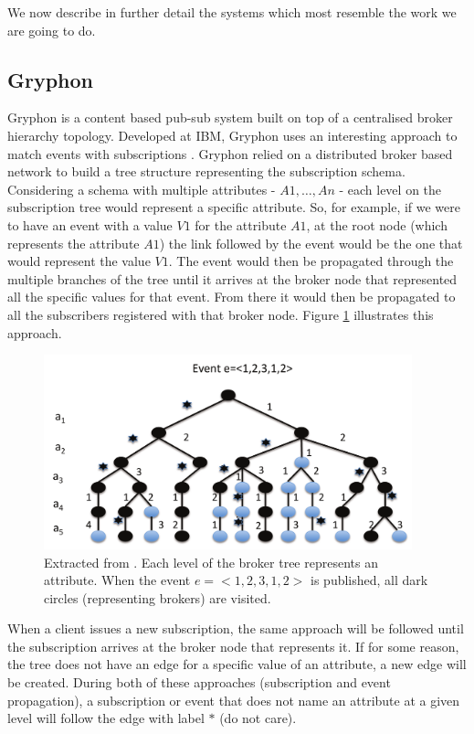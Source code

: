 We now describe in further detail the systems which most resemble the
work we are going to do.

\subsection{Gryphon}\label{gryphon}

Gryphon \cite{Strom1998} is a content based pub-sub system
built on top of a centralised broker hierarchy topology. Developed at
IBM, Gryphon uses an interesting approach to match events with
subscriptions \cite{Aguilera1999}. Gryphon relied on a distributed broker based
network to build a tree structure representing the
subscription schema. Considering a schema with multiple attributes -
$A1,\ldots{},An$ - each level on the subscription tree would represent a
specific attribute. So, for example, if we were to have an event with a
value $V1$ for the attribute $A1$, at the root node (which represents the
attribute $A1$) the link followed by the event would be the one that would
represent the value $V1$. The event would then be propagated through the
multiple branches of the tree until it arrives at the broker node that
represented all the specific values for that event. From there it would
then be propagated to all the subscribers registered with that broker
node. Figure \ref{fig:gryphon} illustrates this approach.

\begin{figure}[hb!]
  \centering
  \includegraphics[width=0.95\textwidth]{img/gryphon.png}
  \caption{Extracted from \cite{Kermarrec2013}. Each level of the broker tree represents an attribute.
  When the event $e = <1, 2, 3, 1, 2>$ is published,
  all dark circles (representing brokers) are visited.}
  \label{fig:gryphon}
\end{figure}

When a client issues a new subscription, the same approach will be
followed until the subscription arrives at the broker node that
represents it. If for some reason, the tree does not have an edge for a
specific value of an attribute, a new edge will be created. During both
of these approaches (subscription and event propagation), a subscription
or event that does not name an attribute at a given level will follow
the edge with label $*$ (do not care).

